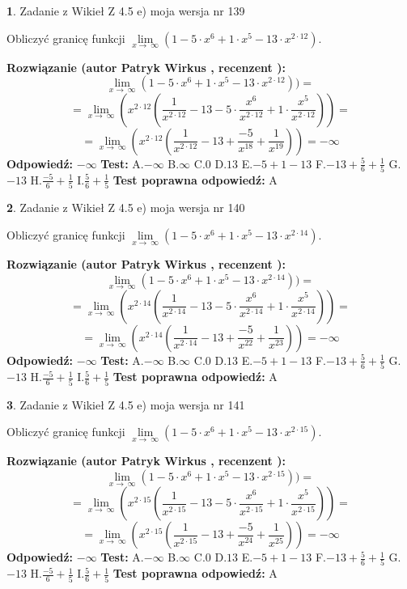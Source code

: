 \documentclass[12pt, a4paper]{article}
\theoremstyle{definition} %
\newtheorem{zad}{}
\newcommand{\zadStart}[1]{\begin{zad}#1\newline}
\newcommand{\zadStop}{\end{zad}}
\newcommand{\rozwStart}[2]{\noindent \textbf{Rozwiązanie (autor #1 , recenzent #2): }\newline}
\newcommand{\rozwStop}{\newline}
\newcommand{\odpStart}{\noindent \textbf{Odpowiedź:}\newline}
\newcommand{\odpStop}{\newline}
\newcommand{\testStart}{\noindent \textbf{Test:}\newline}
\newcommand{\testStop}{\newline}
\newcommand{\kluczStart}{\noindent \textbf{Test poprawna odpowiedź:}\newline}
\newcommand{\kluczStop}{\newline}
\begin{document}
\zadStart{Zadanie z Wikieł Z 4.5 e) moja wersja nr 139}



Obliczyć granicę funkcji  $\lim\limits_{x\to\ \infty}(1 - 5 \cdot x^{6}+1 \cdot x^{5}- 13 \cdot x^{2\cdot12})$.
\zadStop
\rozwStart{Patryk Wirkus}{}
$$\lim\limits_{x\to\ \infty}(1 - 5 \cdot x^{6}+1 \cdot x^{5}- 13 \cdot x^{2\cdot12}))=$$
$$=\lim\limits_{x\to\ \infty}(x^{2\cdot12}(\frac{1}{x^{2\cdot12}}-13 -5 \cdot \frac{x^{6}}{x^{2\cdot12}}+1 \cdot \frac{x^{5}}{x^{2\cdot12}}))=$$
$$=\lim\limits_{x\to\ \infty}(x^{2\cdot12}(\frac{1}{x^{2\cdot12}}-13 + \frac{-5}{x^{18}}+ \frac{1}{x^{19}}))=-\infty$$
\rozwStop
\odpStart
$-\infty$
\odpStop
\testStart
A.$-\infty$ B.$\infty$ C.$0$ D.$13$ E.$-5 + 1 - 13$
F.$-13+\frac{5}{6}+\frac{1}{5}$ G.$-13$
H.$\frac{-5}{6}+\frac{1}{5}$
I.$\frac{5}{6}+\frac{1}{5}$
\testStop
\kluczStart
A
\kluczStop



\zadStart{Zadanie z Wikieł Z 4.5 e) moja wersja nr 140}



Obliczyć granicę funkcji  $\lim\limits_{x\to\ \infty}(1 - 5 \cdot x^{6}+1 \cdot x^{5}- 13 \cdot x^{2\cdot14})$.
\zadStop
\rozwStart{Patryk Wirkus}{}
$$\lim\limits_{x\to\ \infty}(1 - 5 \cdot x^{6}+1 \cdot x^{5}- 13 \cdot x^{2\cdot14}))=$$
$$=\lim\limits_{x\to\ \infty}(x^{2\cdot14}(\frac{1}{x^{2\cdot14}}-13 -5 \cdot \frac{x^{6}}{x^{2\cdot14}}+1 \cdot \frac{x^{5}}{x^{2\cdot14}}))=$$
$$=\lim\limits_{x\to\ \infty}(x^{2\cdot14}(\frac{1}{x^{2\cdot14}}-13 + \frac{-5}{x^{22}}+ \frac{1}{x^{23}}))=-\infty$$
\rozwStop
\odpStart
$-\infty$
\odpStop
\testStart
A.$-\infty$ B.$\infty$ C.$0$ D.$13$ E.$-5 + 1 - 13$
F.$-13+\frac{5}{6}+\frac{1}{5}$ G.$-13$
H.$\frac{-5}{6}+\frac{1}{5}$
I.$\frac{5}{6}+\frac{1}{5}$
\testStop
\kluczStart
A
\kluczStop



\zadStart{Zadanie z Wikieł Z 4.5 e) moja wersja nr 141}



Obliczyć granicę funkcji  $\lim\limits_{x\to\ \infty}(1 - 5 \cdot x^{6}+1 \cdot x^{5}- 13 \cdot x^{2\cdot15})$.
\zadStop
\rozwStart{Patryk Wirkus}{}
$$\lim\limits_{x\to\ \infty}(1 - 5 \cdot x^{6}+1 \cdot x^{5}- 13 \cdot x^{2\cdot15}))=$$
$$=\lim\limits_{x\to\ \infty}(x^{2\cdot15}(\frac{1}{x^{2\cdot15}}-13 -5 \cdot \frac{x^{6}}{x^{2\cdot15}}+1 \cdot \frac{x^{5}}{x^{2\cdot15}}))=$$
$$=\lim\limits_{x\to\ \infty}(x^{2\cdot15}(\frac{1}{x^{2\cdot15}}-13 + \frac{-5}{x^{24}}+ \frac{1}{x^{25}}))=-\infty$$
\rozwStop
\odpStart
$-\infty$
\odpStop
\testStart
A.$-\infty$ B.$\infty$ C.$0$ D.$13$ E.$-5 + 1 - 13$
F.$-13+\frac{5}{6}+\frac{1}{5}$ G.$-13$
H.$\frac{-5}{6}+\frac{1}{5}$
I.$\frac{5}{6}+\frac{1}{5}$
\testStop
\kluczStart
A
\kluczStop
\end{document}

